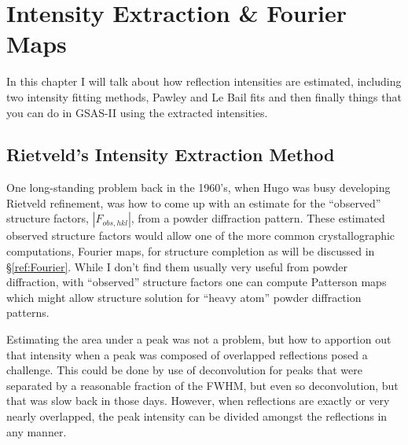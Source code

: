\chapter{Intensity Extraction \& Fourier Maps}\label{Chap:intextraction}

In this chapter I will talk about how reflection intensities are estimated, including two intensity fitting methods, Pawley and Le Bail fits and then finally things that you can do in GSAS-II using the extracted intensities. 

\section{Rietveld's Intensity Extraction Method}

One long-standing problem back in the 1960's, when Hugo was busy developing Rietveld refinement, was how to come up with an estimate for the ``observed'' structure factors, $|F_{obs, hkl}|$, from a powder diffraction pattern. These estimated observed structure factors would allow one of the more common crystallographic computations, Fourier maps, for structure completion as will be discussed in \S\ref{ref:Fourier}. While I don't find them usually very useful from powder diffraction, with ``observed'' structure factors one can compute Patterson maps which might allow structure solution for ``heavy atom'' powder diffraction patterns. 

Estimating the area under a peak was not a problem, but how to apportion out that intensity when a peak was composed of overlapped reflections posed a challenge. This could be done by use of deconvolution for peaks that were separated by a reasonable fraction of the FWHM, but even so deconvolution, but that was slow back in those days. However, when reflections are exactly or very nearly overlapped, the peak intensity can be divided amongst the reflections in any manner. 


